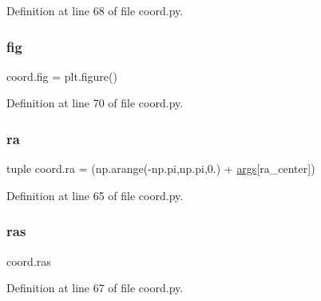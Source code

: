 Definition at line 68 of file coord.\+py.

\mbox{\label{namespacecoord_abd9b02ef552306f922eb3b6d0be56c34}} 
\subsubsection{\texorpdfstring{fig}{fig}}
{\footnotesize\ttfamily coord.\+fig = plt.\+figure()}



Definition at line 70 of file coord.\+py.

\mbox{\label{namespacecoord_a9e8cb473ba5d9c7398020447b51174e0}} 
\subsubsection{\texorpdfstring{ra}{ra}}
{\footnotesize\ttfamily tuple coord.\+ra = (np.\+arange(-\/np.\+pi,np.\+pi,0.) + \hyperlink{namespacecoord_a87ee5c40fe361f2c1bfbea4ed5086028}{args}\mbox{[}\textquotesingle{}ra\+\_\+center\textquotesingle{}\mbox{]})}



Definition at line 65 of file coord.\+py.

\mbox{\label{namespacecoord_a5462056be5c33668cdc23bd703b745c5}} 
\subsubsection{\texorpdfstring{ras}{ras}}
{\footnotesize\ttfamily coord.\+ras}



Definition at line 67 of file coord.\+py.

